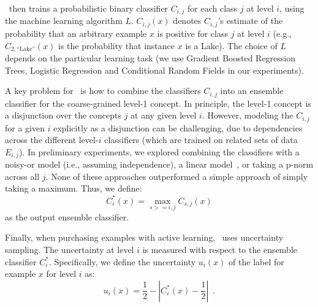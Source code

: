 \documentclass[10pt, conference, compsocconf]{IEEEtran}
\newcommand{\sys}{\Call{Hal}{}} %
\begin{document}
\sys\ then trains a probabilistic binary classifier $C_{i,j}$ for each class $j$ 
at level $i$, using the machine learning algorithm $L$.  $C_{i,j}(x)$ denotes
$C_{i,j}$'s estimate of the probability that an arbitrary example $x$ is positive for class $j$ at level $i$ (e.g.,
$C_{2,\mbox{``Lake''}}(x)$ is the probability that instance $x$ is a Lake).  
The choice of $L$ depends on the particular learning task
(we use Gradient Boosted Regression Trees, Logistic Regression and Conditional Random Fields  in our experiments).

A key problem for \sys\ is how to combine the 
classifiers $C_{i,j}$ into an ensemble classifier for the coarse-grained level-1
concept.  In principle,
the level-1 concept is a disjunction over the concepts $j$ at any given level $i$.
However, modeling the $C_{i,j}$ for a given $i$ explicitly as a disjunction can be
challenging, due to dependencies across the different level-$i$ classifiers (which
are trained on related sets of data $E_{i,j}$).  
In preliminary experiments, we explored
combining the classifiers with a noisy-or model (i.e., assuming independence), a linear model~\cite{Breiman1996},
or taking a p-norm across all $j$.  None of these approaches outperformed a simple approach of
simply taking a maximum.  Thus, we define:
\begin{equation}
\label{eq:maxcombine}
  C_i^*(x) = \max_{s>=i,j} C_{s,j}(x)
\end{equation}
as the output ensemble classifier. 

Finally, when purchasing examples with active learning, \sys\ uses uncertainty sampling.
The uncertainty at level $i$
is measured with respect to the ensemble classifier $C_i^*$.  Specifically,
we define the uncertainty $u_i(x)$ of the label for example $x$ for level $i$ as:
\begin{equation}
 u_i(x) = \frac{1}{2} - \left| C_i^*(x) - \frac{1}{2} \right|
\enspace .
\end{equation}
\end{document}
